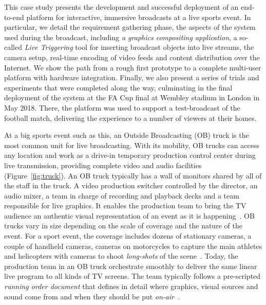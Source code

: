 \documentclass[sigchi-a, authorversion]{acmart}
\begin{document}
This case study presents the development and successful deployment of an
end-to-end platform for interactive, immersive broadcasts at
a live sports event. In particular, we detail the requirement gathering phase,
the aspects of the system used during the broadcast, including \emph{a graphics compositing
application}, a so-called \emph{Live Triggering} tool for inserting broadcast objects
into live streams, the camera setup, real-time encoding of video feeds and content
distribution over the Internet.
We show the path from a rough first prototype to a complete multi-user platform
with hardware integration. Finally, we also present a series of trials and
experiments that were completed along the way, culminating in the final
deployment of the system at the FA Cup final at Wembley stadium in London in
May 2018. There, the platform was used to support a test-broadcast of the
football match, delivering the experience to a number of viewers at
their homes.

At a big sports event such as this, an Outside Broadcasting (OB) truck is the most
common unit for live broadcasting. With its mobility, OB trucks can access any
location and work as a drive-in temporary production control center during live
transmission, providing complete video and audio facilities (Figure~\ref{fig:truck}).
An OB truck typically has a wall of monitors shared by all of the staff in the truck.
A video production switcher controlled by the director, an audio mixer, a team in
charge of recording and playback decks and a team responsible for live graphics.
It enables the production team to bring the TV audience an authentic
visual representation of an event as it is happening~\cite{owens2015}.
OB trucks vary in size depending on the scale of coverage and the nature of the
event. For a sport event, the coverage includes dozens of stationary cameras, a
couple of handheld cameras, cameras on motorcycles to capture the main athletes
and helicopters with cameras to shoot \emph{long-shots} of the
scene~\cite{owens2015, Li:2018_TVX}. Today, the production team in an OB truck
orchestrate smoothly to deliver the same linear live program to all kinds of TV
screens. The team typically follows a pre-scripted \emph{running order document} that
defines in detail where graphics, visual sources and sound come from and when
they should be put \emph{on-air}~\cite{Li:2018_TVX}.
\end{document}
